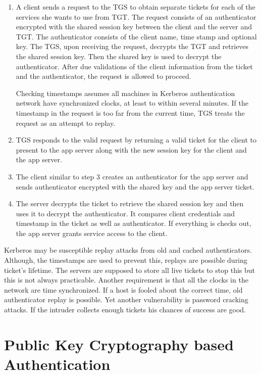 \begin{multicols}{2}
\begin{enumerate}
\item A client sends a request to the TGS to obtain separate tickets for each of the services she wants to use from TGT. The request consists of an authenticator encrypted with the shared session key between the client and the server and TGT. The authenticator consists of the client name, time stamp and optional key. The TGS, upon receiving the request, decrypts the TGT and retrieves the shared session key. Then the shared key is used to decrypt the authenticator. After due validations of the client information from the ticket and the authenticator, the request is allowed to proceed.

Checking timestamps assumes all machines in Kerberos authentication network have synchronized clocks, at least to within several minutes. If the timestamp in the request is too far from the current time, TGS treats the request as an attempt to replay.

\item TGS responds to the valid request by returning a valid ticket for the client to present to the app server along with the new session key for the client and the app server.

\item The client similar to step 3 creates an authenticator for the app server and sends authenticator encrypted with the shared key and the app server ticket.

\item The server decrypts the ticket to retrieve the shared session key and then uses it to decrypt the authenticator. It compares client credentials and timestamp in the ticket as well as authenticator. If everything is checks out, the app server grants service access to the client.
\end{enumerate}

Kerberos may be susceptible replay attacks from old and cached authenticators. Although, the timestamps are used to prevent this, replays are possible during ticket's lifetime. The servers are supposed to store all live tickets to stop this but this is not always practicable. Another requirement is that all the clocks in the network are time synchronized. If a host is fooled about the correct time, old authenticator replay is possible. Yet another vulnerability is password cracking attacks. If the intruder collects enough tickets his chances of success are good.

\section*{Public Key Cryptography based Authentication}


\end{multicols}
